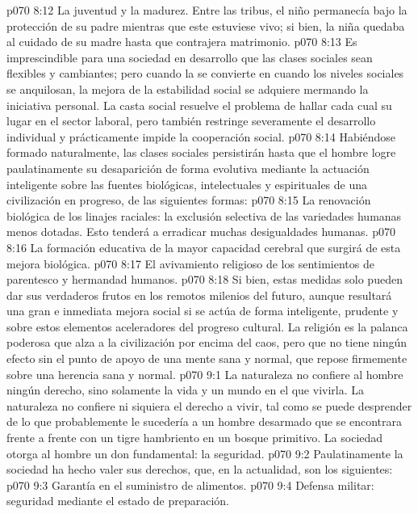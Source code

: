 \vs p070 8:12  La juventud y la madurez. Entre las tribus, el niño permanecía bajo la protección de su padre mientras que este estuviese vivo; si bien, la niña quedaba al cuidado de su madre hasta que contrajera matrimonio.
\vs p070 8:13 \pc Es imprescindible para una sociedad en desarrollo que las clases sociales sean flexibles y cambiantes; pero cuando la  se convierte en  cuando los niveles sociales se anquilosan, la mejora de la estabilidad social se adquiere mermando la iniciativa personal. La casta social resuelve el problema de hallar cada cual su lugar en el sector laboral, pero también restringe severamente el desarrollo individual y prácticamente impide la cooperación social.
\vs p070 8:14 Habiéndose formado naturalmente, las clases sociales persistirán hasta que el hombre logre paulatinamente su desaparición de forma evolutiva mediante la actuación inteligente sobre las fuentes biológicas, intelectuales y espirituales de una civilización en progreso, de las siguientes formas:
\vs p070 8:15 La renovación biológica de los linajes raciales: la exclusión selectiva de las variedades humanas menos dotadas. Esto tenderá a erradicar muchas desigualdades humanas.
\vs p070 8:16 La formación educativa de la mayor capacidad cerebral que surgirá de esta mejora biológica.
\vs p070 8:17 El avivamiento religioso de los sentimientos de parentesco y hermandad humanos.
\vs p070 8:18 \pc Si bien, estas medidas solo pueden dar sus verdaderos frutos en los remotos milenios del futuro, aunque resultará una gran e inmediata mejora social si se actúa de forma inteligente, prudente y  sobre estos elementos aceleradores del progreso cultural. La religión es la palanca poderosa que alza a la civilización por encima del caos, pero que no tiene ningún efecto sin el punto de apoyo de una mente sana y normal, que repose firmemente sobre una herencia sana y normal.
\vs p070 9:1 La naturaleza no confiere al hombre ningún derecho, sino solamente la vida y un mundo en el que vivirla. La naturaleza no confiere ni siquiera el derecho a vivir, tal como se puede desprender de lo que probablemente le sucedería a un hombre desarmado que se encontrara frente a frente con un tigre hambriento en un bosque primitivo. La sociedad otorga al hombre un don fundamental: la seguridad.
\vs p070 9:2 \pc Paulatinamente la sociedad ha hecho valer sus derechos, que, en la actualidad, son los siguientes:
\vs p070 9:3 Garantía en el suministro de alimentos.
\vs p070 9:4 Defensa militar: seguridad mediante el estado de preparación.
